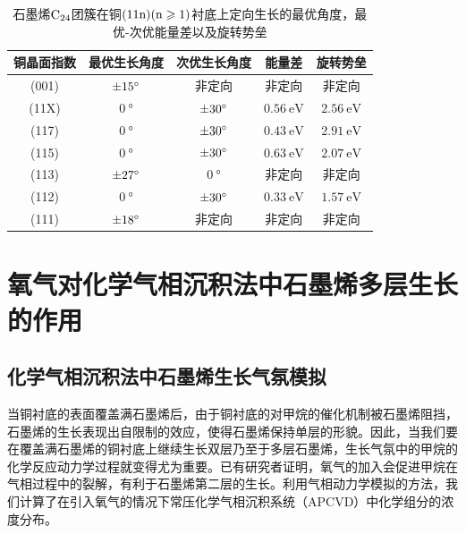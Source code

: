 \begin{table}[htb]
    \caption{石墨烯$\rm{C_{24}}$团簇在铜$\rm{(11n)(n \geqslant 1)}$衬底上定向生长的最优角度，最优-次优能量差以及旋转势垒}
    \centering
    \begin{tabular}{ccccc}
        \toprule
        铜晶面指数 & 最优生长角度            & 次优生长角度           & 能量差  & 旋转势垒 \\
        \midrule
        (001)      & $\SI{\pm 15 }{\degree}$ & 非定向                 & 非定向                      & 非定向                       \\
        (11X)      & $\SI{0}{\degree}$       & $\SI{\pm 30}{\degree}$ & $\SI{0.56 }{\electronvolt}$ & $\SI{2.56 }{\electronvolt}$  \\
        (117)      & $\SI{0}{\degree}$       & $\SI{\pm 30}{\degree}$ & $\SI{0.43 }{\electronvolt}$ & $\SI{2.91 }{\electronvolt}$  \\
        (115)      & $\SI{0}{\degree}$       & $\SI{\pm 30}{\degree}$ & $\SI{0.63 }{\electronvolt}$ & $\SI{2.07}{\electronvolt}$  \\
        (113)      & $\SI{\pm 27}{\degree}$  & $\SI{0}{\degree}$      & 非定向                      & 非定向                       \\
        (112)      & $\SI{0}{\degree}$       & $\SI{\pm 30}{\degree}$ & $\SI{0.33 }{\electronvolt}$ & $\SI{1.57 }{\electronvolt}$  \\
        (111)      & $\SI{\pm 18 }{\degree}$ & 非定向                 & 非定向                      & 非定向                       \\
        \bottomrule
    \end{tabular}
    \label{tab:GO_energyDiff_barrier}
\end{table}

\section{氧气对化学气相沉积法中石墨烯多层生长的作用}
\label{sec:石墨烯氧蚀刻穿透}
\def\muO#1{\it \mu_{\rm O}^{\rm #1} \it}
\def\halfEOm{\it \frac{1}{2}E_{\rm \cemb{O2}} \it}
\def\EOa{\it E_{\rm O} \it }
\def\Cdis{\rm{\left[C_{dis.}\right]} \it }
\def\Oads{\rm{\left[O_{ads.}\right]} \it }
\def\RateV#1#2{\it \nu_{\rm #1}^{\rm #2} \it }
\def\RateK#1#2{\it{k_{\rm #1}^{\rm #2}} \it }
\def\ReactTime#1#2{\it{t_{\rm #1}^{\rm #2}} \it }

\subsection{化学气相沉积法中石墨烯生长气氛模拟}
\label{subsec:FLG_gasPhase}
当铜衬底的表面覆盖满石墨烯后，由于铜衬底的对甲烷的催化机制被石墨烯阻挡，石墨烯的生长表现出自限制的效应，使得石墨烯保持单层的形貌。因此，当我们要在覆盖满石墨烯的铜衬底上继续生长双层乃至于多层石墨烯，生长气氛中的甲烷的化学反应动力学过程就变得尤为重要。已有研究者证明，氧气的加入会促进甲烷在气相过程中的裂解，有利于石墨烯第二层的生长。利用气相动力学模拟的方法，我们计算了在引入氧气的情况下常压化学气相沉积系统（APCVD）中化学组分的浓度分布。

